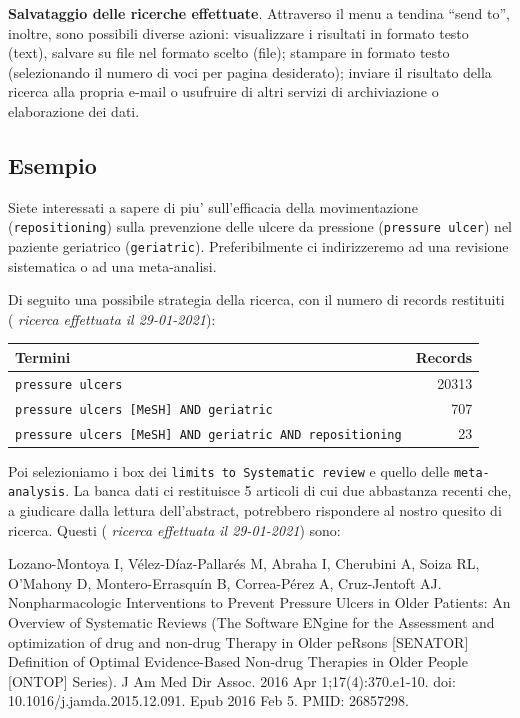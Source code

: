 \documentclass[]{book}
\begin{document}
\textbf{Salvataggio delle ricerche effettuate}. Attraverso il menu a tendina ``send to'', inoltre, sono possibili diverse azioni: visualizzare i risultati in formato testo (text), salvare su file nel formato scelto (file); stampare in formato testo (selezionando il numero di voci per pagina desiderato); inviare il risultato della ricerca alla propria e-mail o usufruire di altri servizi di archiviazione o elaborazione dei dati.

\hypertarget{esempio}{%
\subsection{Esempio}\label{esempio}}

Siete interessati a sapere di piu' sull'efficacia della movimentazione (\texttt{repositioning}) sulla prevenzione delle ulcere da pressione (\texttt{pressure\ ulcer}) nel paziente geriatrico (\texttt{geriatric}). Preferibilmente ci indirizzeremo ad una revisione sistematica o ad una meta-analisi.

Di seguito una possibile strategia della ricerca, con il numero di records restituiti ( \emph{ricerca effettuata il 29-01-2021}):

\begin{longtable}[]{@{}lr@{}}
\toprule
Termini & Records\tabularnewline
\midrule
\endhead
\texttt{pressure\ ulcers} & 20313\tabularnewline
\texttt{pressure\ ulcers\ {[}MeSH{]}\ AND\ geriatric} & 707\tabularnewline
\texttt{pressure\ ulcers\ {[}MeSH{]}\ AND\ geriatric\ AND\ repositioning} & 23\tabularnewline
\bottomrule
\end{longtable}

Poi selezioniamo i box dei \texttt{limits\ to\ Systematic\ review} e quello delle \texttt{meta-analysis}. La banca dati ci restituisce 5 articoli di cui due abbastanza recenti che, a giudicare dalla lettura dell'abstract, potrebbero rispondere al nostro quesito di ricerca. Questi ( \emph{ricerca effettuata il 29-01-2021}) sono:

Lozano-Montoya I, Vélez-Díaz-Pallarés M, Abraha I, Cherubini A, Soiza RL, O'Mahony D, Montero-Errasquín B, Correa-Pérez A, Cruz-Jentoft AJ. Nonpharmacologic Interventions to Prevent Pressure Ulcers in Older Patients: An Overview of Systematic Reviews (The Software ENgine for the Assessment and optimization of drug and non-drug Therapy in Older peRsons {[}SENATOR{]} Definition of Optimal Evidence-Based Non-drug Therapies in Older People {[}ONTOP{]} Series). J Am Med Dir Assoc. 2016 Apr 1;17(4):370.e1-10. doi: 10.1016/j.jamda.2015.12.091. Epub 2016 Feb 5. PMID: 26857298.
\end{document}
